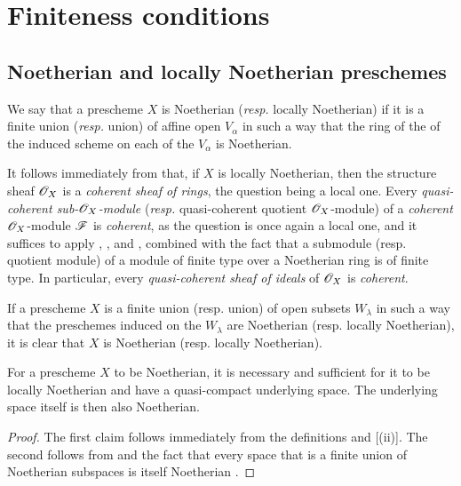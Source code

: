 \section{Finiteness conditions}
\label{section-finiteness-conditions}

\subsection{Noetherian and locally Noetherian preschemes}
\label{subsection-noetherian-and-locally-noetherian-preschemes}

\begin{defn}[6.1.1]
\label{1.6.1.1}
We say that a prescheme $X$ is Noetherian (\emph{resp.} locally Noetherian) if it is a finite union (\emph{resp.} union) of affine open $V_\alpha$ in such a way that the ring of the of the induced scheme on each of the $V_\alpha$ is Noetherian.
\end{defn}

It follows immediately from  that, if $X$ is locally Noetherian, then the structure sheaf $\mathscr{O}_X$ is a \emph{coherent sheaf of rings}, the question being a local one.
Every \emph{quasi-coherent sub-$\mathscr{O}_X$-module} (\emph{resp.} quasi-coherent quotient $\mathscr{O}_X$-module) of a \emph{coherent} $\mathscr{O}_X$-module $\mathscr{F}$ is \emph{coherent}, as the question is once again a local one, and it suffices to apply , , and , combined with the fact that a submodule (resp. quotient module) of a module of finite type over a Noetherian ring is of finite type.
In particular, every \emph{quasi-coherent sheaf of ideals} of $\mathscr{O}_X$ is \emph{coherent}.

If a prescheme $X$ is a finite union (resp. union) of open subsets $W_\lambda$ in such a way that the preschemes induced on the $W_\lambda$ are Noetherian (resp. locally Noetherian), it is clear that $X$ is Noetherian (resp. locally Noetherian).

\begin{prop}[6.1.2]
\label{1.6.1.2}
For a prescheme $X$ to be Noetherian, it is necessary and sufficient for it to be locally Noetherian and have a quasi-compact underlying space.
The underlying space itself is then also Noetherian.
\end{prop}

\begin{proof}
\label{proof-1.6.1.2}
The first claim follows immediately from the definitions and [(ii)].
The second follows from  and the fact that every space that is a finite union of Noetherian subspaces is itself Noetherian .
\end{proof}

